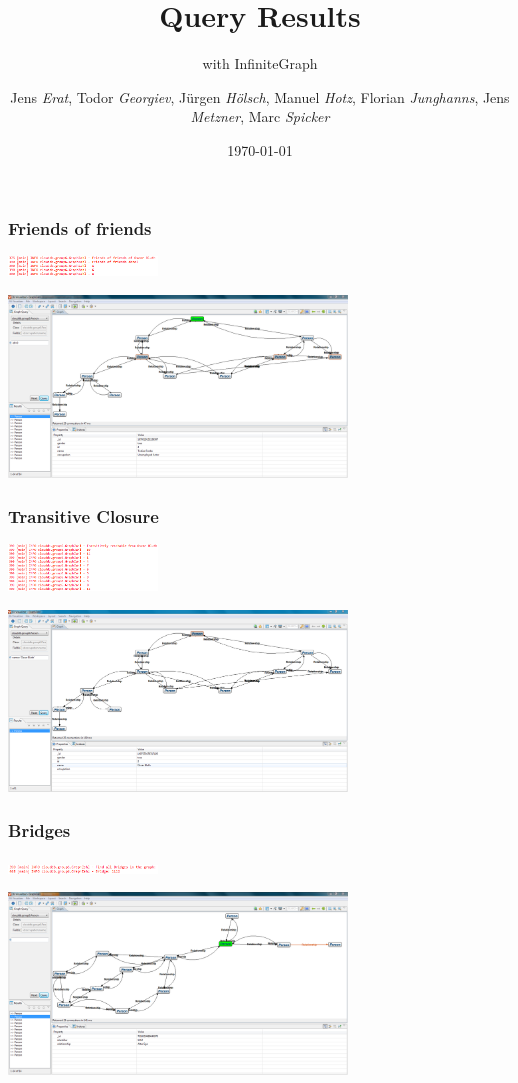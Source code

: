 \documentclass{beamer}
\title[Query Results]{\textsf{Query Results}}
\subtitle{with InfiniteGraph}
\author[JE,TG,JH,MH,FJ,JM,MS]{Jens \textit{Erat},
Todor \textit{Georgiev},
J\"{u}rgen \textit{H\"{o}lsch},
Manuel \textit{Hotz},
Florian \textit{Junghanns},
Jens \textit{Metzner},
Marc \textit{Spicker}}
\institute[]{Universität Konstanz}
\date{\today}
\begin{document}

\begin{frame}
\titlepage
\end{frame}


\begin{frame}
\frametitle{Friends of friends}

\includegraphics[width=150px]{imgs/fof_query}

\includegraphics[width=340px]{imgs/fof_result}

\end{frame}


\begin{frame}
\frametitle{Transitive Closure}

\includegraphics[width=150px]{imgs/transitive_query}

\includegraphics[width=340px]{imgs/transitive_result}

\end{frame}

\begin{frame}
\frametitle{Bridges}

\includegraphics[width=150px]{imgs/bridge_query}

\includegraphics[width=340px]{imgs/bridge_result}

\end{frame}
\end{document}
